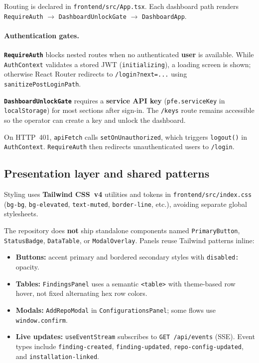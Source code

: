 Routing is declared in \texttt{frontend/src/App.tsx}. Each dashboard path renders \texttt{RequireAuth} $\rightarrow$ \texttt{DashboardUnlockGate} $\rightarrow$ \texttt{DashboardApp}.

\paragraph{Authentication gates.}
\textbf{\texttt{RequireAuth}} blocks nested routes when no authenticated \textbf{user} is available. While \texttt{AuthContext} validates a stored JWT (\texttt{initializing}), a loading screen is shown; otherwise React Router redirects to \texttt{/login?next=...} using \texttt{sanitizePostLoginPath}.

\textbf{\texttt{DashboardUnlockGate}} requires a \textbf{service API key} (\texttt{pfe.serviceKey} in \texttt{localStorage}) for most sections after sign-in. The \texttt{/keys} route remains accessible so the operator can create a key and unlock the dashboard.

On HTTP~401, \texttt{apiFetch} calls \texttt{setOnUnauthorized}, which triggers \texttt{logout()} in \texttt{AuthContext}. \texttt{RequireAuth} then redirects unauthenticated users to \texttt{/login}.

\subsection{Presentation layer and shared patterns}
\label{subsec:presentation}

Styling uses \textbf{Tailwind CSS~v4} utilities and tokens in \texttt{frontend/src/index.css} (\texttt{bg-bg}, \texttt{bg-elevated}, \texttt{text-muted}, \texttt{border-line}, etc.), avoiding separate global stylesheets.

The repository does \textbf{not} ship standalone components named \texttt{PrimaryButton}, \texttt{StatusBadge}, \texttt{DataTable}, or \texttt{ModalOverlay}. Panels reuse Tailwind patterns inline:
\begin{itemize}
    \item \textbf{Buttons:} accent primary and bordered secondary styles with \texttt{disabled:} opacity.
    \item \textbf{Tables:} \texttt{FindingsPanel} uses a semantic \texttt{<table>} with theme-based row hover, not fixed alternating hex row colors.
    \item \textbf{Modals:} \texttt{AddRepoModal} in \texttt{ConfigurationsPanel}; some flows use \texttt{window.confirm}.
    \item \textbf{Live updates:} \texttt{useEventStream} subscribes to \texttt{GET /api/events} (SSE). Event types include \texttt{finding-created}, \texttt{finding-updated}, \texttt{repo-config-updated}, and \texttt{installation-linked}.
\end{itemize}

